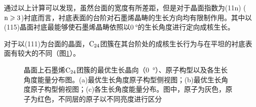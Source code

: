 通过以上计算可以发现，虽然台面的宽度有所差距，但是对于晶面指数为(11n) ($\rm{n \geqslant 3}$)衬底而言，衬底表面的台阶对石墨烯晶畴的生长方向均有限制作用。其中以(115)晶面衬底最能够使石墨烯晶畴依照以$\SI{0 }{\degree}$的生长角度进行定向成核生长。

对于以(111)为台面的晶面，$\rm{C_{24}}$团簇在其台阶处的成核生长行为与在平坦的衬底表面有较大的不同（图\ref{fig:GO_C24_112}）。

\begin{figure}[b]
\end{figure}
\begin{figure}[t]\ContinuedFloat
    \caption{晶面上石墨烯$\rm{C_{24}}$团簇的最优生长晶向（\SI{0}  {\degree}）、原子构型以及各生长角度能量分布图。(a)最优生长角度原子构型侧视图；(b)最优生长角度原子构型俯视图；(c)各生长角度能量分布。图中，原子为灰色，原子为红色，不同层的原子以不同亮度进行区分}
    \label{fig:GO_C24_112}
\end{figure}


